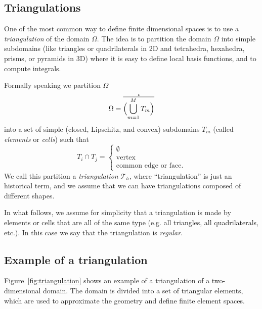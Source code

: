 
\subsection{Triangulations}

One of the most common way to define finite dimensional spaces is to use a
\emph{triangulation} of the domain $\Omega$. The idea is to partition the domain
$\Omega$ into simple subdomains (like triangles or quadrilaterals in 2D and
tetrahedra, hexahedra, prisms, or pyramids in 3D) where it is easy to define
local basis functions, and to compute integrals.

Formally speaking we partition $\Omega$
\begin{equation*}
\Omega = \mathring{\overline{\Bigl(\bigcup_{m=1}^M T_m \Bigr)}}
\end{equation*}
into a set of simple (closed, Lipschitz, and convex) subdomains $T_m$ (called \emph{elements} or \emph{cells})
such that 
\begin{equation}
T_i \cap T_j = \begin{cases}\emptyset \\ \text{vertex} \\ \text{common edge or face}.\end{cases}
\end{equation}
We call this partition a \emph{triangulation} $\mathcal{T}_h$, where
``triangulation'' is just an historical term, and we assume that we can have
triangulations composed of different shapes.

In what follows, we assume for simplicity that a triangulation is made by
elements or cells that are all of the same type (e.g. all triangles, all
quadrilaterals, etc.). In this case we say that the triangulation is
\emph{regular}.

\subsection{Example of a triangulation}

Figure~\ref{fig:triangulation} shows an example of a triangulation of a two-dimensional domain. The domain is divided into a set of triangular elements, which are used to approximate the geometry and define finite element spaces.

